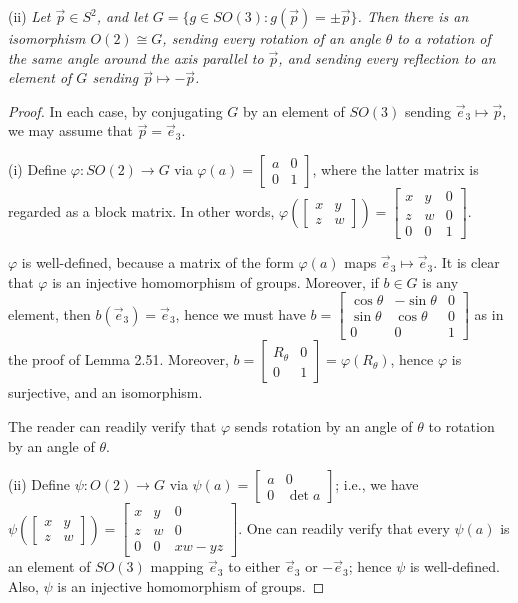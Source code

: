 \documentclass[leqno]{book}
\begin{document}
(ii) \emph{Let $\vec p\in S^2$, and let $G=\{g\in SO(3):g(\vec p)=\pm\vec p\}$.  Then there is an isomorphism $O(2)\cong G$, sending every rotation of an angle $\theta$ to a rotation of the same angle around the axis parallel to $\vec p$, and sending every reflection to an element of $G$ sending $\vec p\mapsto-\vec p$.}
\begin{proof}
In each case, by conjugating $G$ by an element of $SO(3)$ sending $\vec e_3\mapsto\vec p$, we may assume that $\vec p=\vec e_3$.

(i) Define $\varphi:SO(2)\to G$ via $\varphi(a)=\begin{bmatrix}a&0\\0&1\end{bmatrix}$, where the latter matrix is regarded as a block matrix.  In other words, $\varphi\left(\begin{bmatrix}x&y\\z&w\end{bmatrix}\right)=\begin{bmatrix}x&y&0\\z&w&0\\0&0&1\end{bmatrix}$.

$\varphi$ is well-defined, because a matrix of the form $\varphi(a)$ maps $\vec e_3\mapsto\vec e_3$.  It is clear that $\varphi$ is an injective homomorphism of groups.  Moreover, if $b\in G$ is any element, then $b(\vec e_3)=\vec e_3$, hence we must have $b=\begin{bmatrix}\cos\theta&-\sin\theta&0\\\sin\theta&\cos\theta&0\\0&0&1\end{bmatrix}$ as in the proof of Lemma 2.51.  Moreover, $b=\begin{bmatrix}R_\theta&0\\0&1\end{bmatrix}=\varphi(R_\theta)$, hence $\varphi$ is surjective, and an isomorphism.

The reader can readily verify that $\varphi$ sends rotation by an angle of $\theta$ to rotation by an angle of $\theta$.

(ii) Define $\psi:O(2)\to G$ via $\psi(a)=\begin{bmatrix}a&0\\0&\det a\end{bmatrix}$; i.e., we have $\psi\left(\begin{bmatrix}x&y\\z&w\end{bmatrix}\right)=\begin{bmatrix}x&y&0\\z&w&0\\0&0&xw-yz\end{bmatrix}$.  One can readily verify that every $\psi(a)$ is an element of $SO(3)$ mapping $\vec e_3$ to either $\vec e_3$ or $-\vec e_3$; hence $\psi$ is well-defined.  Also, $\psi$ is an injective homomorphism of groups.


\end{proof}
\end{document}
